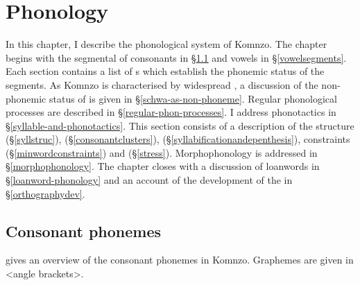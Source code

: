 
\chapter{Phonology} \label{cha:Phonology}

In this chapter, I describe the phonological system of Komnzo. The chapter begins with the segmental  of consonants in {\S}\ref{consonant-segments} and vowels in {\S}\ref{vowelsegments}. Each section contains a list of s which establish the phonemic status of the segments. As Komnzo  is characterised by widespread , a discussion of the non-phonemic status of  is given in {\S}\ref{schwa-as-non-phoneme}. Regular phonological processes are described in {\S}\ref{regular-phon-processes}. I address phonotactics in {\S}\ref{syllable-and-phonotactics}. This section consists of a description of the  structure ({\S}\ref{syllstruc}),  ({\S}\ref{consonantclusters}),  ({\S}\ref{syllabificationandepenthesis}),  constraints ({\S}\ref{minwordconstraints}) and  ({\S}\ref{stress}). Morphophonology is addressed in {\S}\ref{morphophonology}. The chapter closes with a discussion of loanwords in {\S}\ref{loanword-phonology} and an account of the development of the  in {\S}\ref{orthographydev}.
\vspace{-0,3cm}

\section{Consonant phonemes} \label{consonant-segments}

 gives an overview of the consonant phonemes in Komnzo. Graphemes are given in <angle brackets>.

